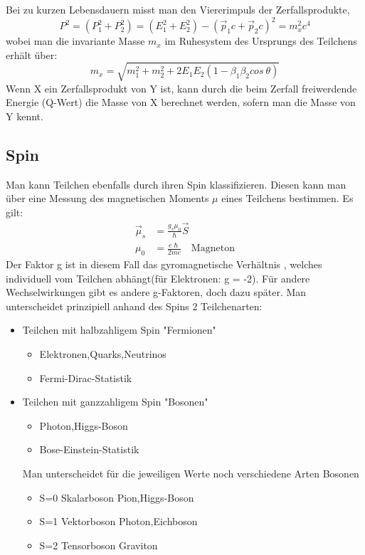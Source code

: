 \documentclass[Ex4_Zusammenfassung.tex]{subfiles}
\begin{document}
Bei zu kurzen Lebensdauern misst man den Viererimpuls der Zerfallsprodukte,
\begin{equation}
P^2 = (P_1^2 + P_2^2) = (E_1^2 + E_2^2) - (\vec p_1 c + \vec p_2 c)^2 = m_x^2 c^4
\end{equation}
wobei man die invariante Masse $ m_x $ im Ruhesystem des Ursprungs des Teilchens erhält über: 
\begin{equation}
m_x = \sqrt{m_1^2 + m_2^2 + 2E_1E_2(1-\beta_{1} \beta_{2} cos \ \theta ) }
\end{equation}
Wenn X ein Zerfallsprodukt von Y ist, kann durch die beim Zerfall freiwerdende Energie (Q-Wert) die Masse von X berechnet werden, sofern man die Masse von Y kennt.

\subsection*{Spin}
Man kann Teilchen ebenfalls durch ihren Spin klassifizieren. 
Diesen kann man über eine Messung des magnetischen Moments $ \mu $ eines Teilchens bestimmen. Es gilt: 
\begin{align}
\vec \mu_{s} &= \frac{g_s \mu_0 } {\hslash} \vec S \\
\mu_{0} &= \frac{e \hslash}{2mc} \quad \text{Magneton}
\end{align}
Der Faktor g ist in diesem Fall das gyromagnetische Verhältnis , welches individuell vom Teilchen abhängt(für Elektronen: g = -2). Für andere Wechselwirkungen gibt es andere g-Faktoren, doch dazu später.\newline
Man unterscheidet prinzipiell anhand des Spins 2 Teilchenarten: 
\begin{itemize}
\item Teilchen mit halbzahligem Spin "Fermionen" 
						\begin{itemize}
						\item Elektronen,Quarks,Neutrinos
						\item Fermi-Dirac-Statistik
						\end{itemize}
\item Teilchen mit ganzzahligem Spin "Bosonen"
						\begin{itemize}
						\item Photon,Higgs-Boson
						\item Bose-Einstein-Statistik
						\end{itemize}
	Man unterscheidet für die jeweiligen Werte noch verschiedene Arten Bosonen
						\begin{itemize}
						\item S=0 \qquad Skalarboson \qquad Pion,Higgs-Boson
						\item S=1 \qquad Vektorboson \qquad Photon,Eichboson
						\item S=2 \qquad Tensorboson \qquad Graviton
						\end{itemize}
\end{itemize} 
\end{document}
